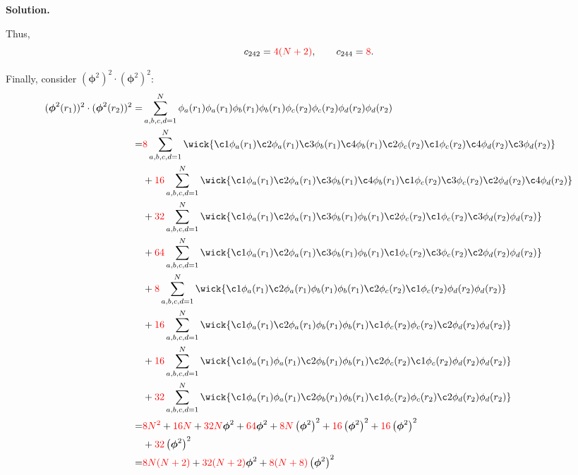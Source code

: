 \documentclass[11pt,a4paper]{article}
\newcounter{problem}
\newcounter{saveequation}
\newenvironment{solution}
{
	\par
	\setcounter{saveequation}{\value{equation}}
	\begingroup
	\setcounter{equation}{0}
	\renewcommand{\theequation}{\arabic{problem}.\arabic{equation}}
	\renewcommand{\theHequation}{sol.\arabic{problem}.\arabic{equation}}
	\noindent\textbf{Solution.}\quad
}
{
	\par
	\endgroup
	\setcounter{equation}{\value{saveequation}}
}
\begin{document}
\begin{solution}
		Thus,
		\[
		c_{242}=\textcolor{red}{4(N+2)},
		\qquad
		c_{244}=\textcolor{red}{8}.
		\]
		
		Finally, consider $(\boldsymbol{\phi}^2)^2\cdot(\boldsymbol{\phi}^2)^2$:
		\begin{align*}
			(\boldsymbol{\phi}^2(r_1))^2\cdot(\boldsymbol{\phi}^2(r_2))^2
			=&
			\sum_{a,b,c,d=1}^{N}
			\phi_a(r_1)\phi_a(r_1)
			\phi_b(r_1)\phi_b(r_1)
			\phi_c(r_2)\phi_c(r_2)
			\phi_d(r_2)\phi_d(r_2)\\
			=&\textcolor{red}{8}
			\sum_{a,b,c,d=1}^{N}
			\wick{
				\c1\phi_a(r_1)\c2\phi_a(r_1)
				\c3\phi_b(r_1)\c4\phi_b(r_1)
				\c2\phi_c(r_2)\c1\phi_c(r_2)
				\c4\phi_d(r_2)\c3\phi_d(r_2)
			}\\
			&+\textcolor{red}{16}\sum_{a,b,c,d=1}^{N}
			\wick{
				\c1\phi_a(r_1)\c2\phi_a(r_1)
				\c3\phi_b(r_1)\c4\phi_b(r_1)
				\c1\phi_c(r_2)\c3\phi_c(r_2)
				\c2\phi_d(r_2)\c4\phi_d(r_2)
			}\\
			&+\textcolor{red}{32}\sum_{a,b,c,d=1}^{N}
			\wick{
				\c1\phi_a(r_1)\c2\phi_a(r_1)
				\c3\phi_b(r_1)\phi_b(r_1)
				\c2\phi_c(r_2)\c1\phi_c(r_2)
				\c3\phi_d(r_2)\phi_d(r_2)
			}\\
			&+\textcolor{red}{64}
			\sum_{a,b,c,d=1}^{N}
			\wick{
				\c1\phi_a(r_1)\c2\phi_a(r_1)
				\c3\phi_b(r_1)\phi_b(r_1)
				\c1\phi_c(r_2)\c3\phi_c(r_2)
				\c2\phi_d(r_2)\phi_d(r_2)
			}
			\\
			&+\textcolor{red}{8}
			\sum_{a,b,c,d=1}^{N}
			\wick{
				\c1\phi_a(r_1)\c2\phi_a(r_1)
				\phi_b(r_1)\phi_b(r_1)
				\c2\phi_c(r_2)\c1\phi_c(r_2)
				\phi_d(r_2)\phi_d(r_2)
			}\\
			&+\textcolor{red}{16}
			\sum_{a,b,c,d=1}^{N}
			\wick{
				\c1\phi_a(r_1)\c2\phi_a(r_1)
				\phi_b(r_1)\phi_b(r_1)
				\c1\phi_c(r_2)\phi_c(r_2)
				\c2\phi_d(r_2)\phi_d(r_2)
			}\\
			&+\textcolor{red}{16}
			\sum_{a,b,c,d=1}^{N}
			\wick{
				\c1\phi_a(r_1)\phi_a(r_1)
				\c2\phi_b(r_1)\phi_b(r_1)
				\c2\phi_c(r_2)\c1\phi_c(r_2)
				\phi_d(r_2)\phi_d(r_2)
			}\\
			&+\textcolor{red}{32}
			\sum_{a,b,c,d=1}^{N}
			\wick{
				\c1\phi_a(r_1)\phi_a(r_1)
				\c2\phi_b(r_1)\phi_b(r_1)
				\c1\phi_c(r_2)\phi_c(r_2)
				\c2\phi_d(r_2)\phi_d(r_2)
			}\\
			=&\textcolor{red}{8N^2}+\textcolor{red}{16N}+\textcolor{red}{32N}\boldsymbol{\phi}^2+\textcolor{red}{64}\boldsymbol{\phi}^2+\textcolor{red}{8N}\left(\boldsymbol{\phi}^2\right)^2+\textcolor{red}{16}\left(\boldsymbol{\phi}^2\right)^2+\textcolor{red}{16}\left(\boldsymbol{\phi}^2\right)^2\\
			&+\textcolor{red}{32}\left(\boldsymbol{\phi}^2\right)^2\\
			=&\textcolor{red}{8N(N+2)}+\textcolor{red}{32(N+2)}\boldsymbol{\phi}^2+\textcolor{red}{8(N+8)}\left(\boldsymbol{\phi}^2\right)^2
		\end{align*}
		

\end{solution}
\end{document}
